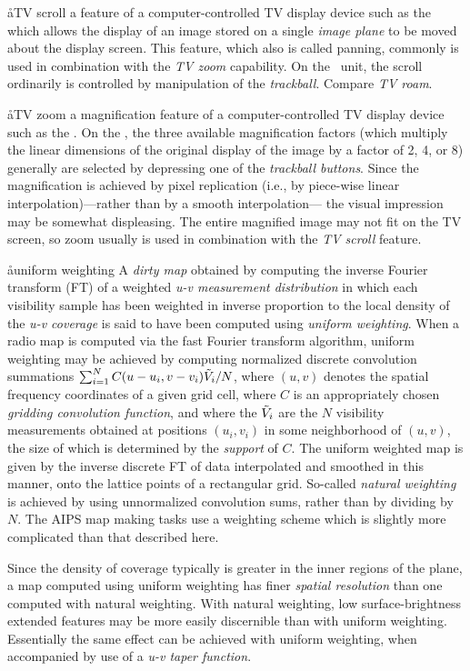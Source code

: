 \aa{TV scroll}
a feature of a computer-controlled TV display device
such as the {\it\iis}\ %
which allows the display of an image stored on a single {\it image plane}
to be moved about the display screen.
This feature, which also is called panning,
commonly is used in combination with the {\it TV zoom} capability.
On the \iis\ unit, the scroll ordinarily is controlled by manipulation
of the {\it trackball}.
Compare {\it TV roam}.

\aa{TV zoom}
a magnification feature
of a computer-controlled TV display device such as the {\it\iis}.
On the \iis, the three available magnification factors
(which multiply the linear dimensions of the original display of the image
by a factor of 2, 4, or 8)
generally are selected by depressing one of the {\it trackball buttons}.
Since the magnification is achieved by pixel replication (i.e.,
by piece-wise linear interpolation)---rather than by a smooth interpolation---%
the visual impression may be somewhat displeasing.
The entire magnified image may not fit on the TV screen,
so zoom usually is used in combination with the {\it TV scroll}
feature.

\aa{uniform weighting}
A {\it dirty map} obtained by computing the inverse Fourier
transform (FT) of a weighted {\it u-v measurement distribution}
in which each visibility sample has been weighted in inverse
proportion to the local density of the {\it u-v coverage}
is said to have been computed using {\it uniform weighting}.
When a radio map is computed via the fast Fourier transform algorithm,
uniform weighting may be achieved
by computing normalized discrete convolution summations
$\sum_{i=1}^N C(u-u_i,v-v_i)\tilde V_i/N$,
where $(u,v)$ denotes the spatial frequency coordinates of a given
\uv grid cell, where
$C$ is an appropriately chosen {\it gridding convolution function},
and where
the $\tilde V_i$ are the $N$ visibility measurements obtained
at positions $(u_i,v_i)$ in some neighborhood
of $(u,v)$, the size of which is determined by the {\it support} of $C$.
The uniform weighted map is given by the inverse discrete FT
of data interpolated and smoothed in this manner, onto the lattice
points of a rectangular grid.
So-called {\it natural weighting} is achieved by using unnormalized
convolution sums, rather than by dividing by $N$.
The AIPS map making tasks use a weighting scheme which is slightly
more complicated than that described here.
\par
Since the density of \uv coverage typically is greater in
the inner regions of the \uv plane,
a map computed using uniform weighting has finer {\it spatial
resolution} than one computed with natural weighting.
With natural weighting, low surface-brightness extended features
may be more easily discernible than with uniform weighting.
Essentially the same effect can be achieved with uniform weighting,
when accompanied by use of a {\it u-v taper function}.

